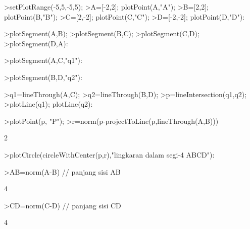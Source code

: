 \documentclass[12pt,arial,letterpaper]{book}
\begin{document}
\begin{eulernootebook}
\begin{eulercomment}
\begin{eulercomment}
\begin{eulernootebook}
\begin{eulercomment}
\begin{eulercomment}
\begin{eulercomment}
\begin{eulercomment}
\begin{eulercomment}
\begin{eulercomment}
\begin{eulernotebook}
\begin{eulercomment}
\begin{eulercomment}
\begin{eulercomment}
\begin{eulercomment}
\begin{eulercomment}
\begin{eulercomment}
\begin{eulercomment}
\end{eulercomment}
\begin{eulerprompt}
>setPlotRange(-5,5,-5,5);
>A=[-2,2]; plotPoint(A,"A");
>B=[2,2]; plotPoint(B,"B");
>C=[2,-2]; plotPoint(C,"C");
>D=[-2,-2]; plotPoint(D,"D"):
\end{eulerprompt}
\begin{eulerprompt}
>plotSegment(A,B);
>plotSegment(B,C);
>plotSegment(C,D);
>plotSegment(D,A):
\end{eulerprompt}
\begin{eulerprompt}
>plotSegment(A,C,"q1"):
\end{eulerprompt}
\begin{eulerprompt}
>plotSegment(B,D,"q2"):
\end{eulerprompt}
\begin{eulerprompt}
>q1=lineThrough(A,C);
>q2=lineThrough(B,D);
>p=lineIntersection(q1,q2);
>plotLine(q1); plotLine(q2):
\end{eulerprompt}
\begin{eulerprompt}
>plotPoint(p, "P");
>r=norm(p-projectToLine(p,lineThrough(A,B)))
\end{eulerprompt}
\begin{euleroutput}
  2
\end{euleroutput}
\begin{eulerprompt}
>plotCircle(circleWithCenter(p,r),"lingkaran dalam segi-4 ABCD"):
\end{eulerprompt}
\begin{eulerprompt}
>AB=norm(A-B) // panjang sisi AB
\end{eulerprompt}
\begin{euleroutput}
  4
\end{euleroutput}
\begin{eulerprompt}
>CD=norm(C-D) // panjang sisi CD
\end{eulerprompt}
\begin{euleroutput}
  4
\end{euleroutput}

\end{eulercomment}
\end{eulercomment}
\end{eulercomment}
\end{eulercomment}
\end{eulercomment}
\end{eulercomment}
\end{eulernotebook}
\end{eulercomment}
\end{eulercomment}
\end{eulercomment}
\end{eulercomment}
\end{eulercomment}
\end{eulercomment}
\end{eulernootebook}
\end{eulercomment}
\end{eulercomment}
\end{eulernootebook}
\end{document}
